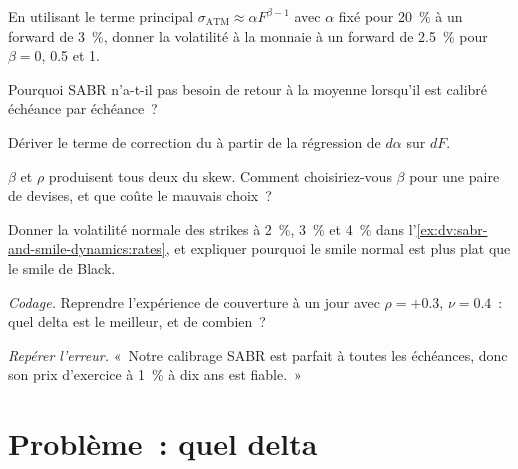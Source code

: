 \begin{exercise}[$\star$]\label{exo:dv:sabr-and-smile-dynamics:2}
En utilisant le terme principal $\sigma_{\mathrm{ATM}}\approx\alpha F^{\beta-1}$ avec $\alpha$ fixé pour 20~\% à un forward de 3~\%, donner
la volatilité à la monnaie à un forward de 2.5~\% pour $\beta=0$, 0.5 et 1.
\end{exercise}

\begin{exercise}[$\star$]\label{exo:dv:sabr-and-smile-dynamics:3}
Pourquoi SABR n'a-t-il pas besoin de retour à la moyenne lorsqu'il est calibré échéance par échéance~?
\end{exercise}

\begin{exercise}[$\star\star$]\label{exo:dv:sabr-and-smile-dynamics:4}
Dériver le terme de correction du  à partir de la régression de $d\alpha$ sur $dF$.
\end{exercise}

\begin{exercise}[$\star\star$]\label{exo:dv:sabr-and-smile-dynamics:5}
$\beta$ et $\rho$ produisent tous deux du skew. Comment choisiriez-vous $\beta$ pour une paire de devises, et que
coûte le mauvais choix~?
\end{exercise}

\begin{exercise}[$\star\star$]\label{exo:dv:sabr-and-smile-dynamics:6}
Donner la volatilité normale des strikes à 2~\%, 3~\% et 4~\% dans l'\cref{ex:dv:sabr-and-smile-dynamics:rates}, et expliquer pourquoi
le smile normal est plus plat que le smile de Black.
\end{exercise}

\begin{exercise}[$\star\star\star$]\label{exo:dv:sabr-and-smile-dynamics:7}
\emph{Codage.} Reprendre l'expérience de couverture à un jour avec $\rho=+0.3$, $\nu=0.4$~: quel delta est le meilleur, et de combien~?
\end{exercise}

\begin{exercise}[$\star\star\star$]\label{exo:dv:sabr-and-smile-dynamics:8}
\emph{Repérer l'erreur.} «~Notre calibrage SABR est parfait à toutes les échéances, donc son prix d'exercice à 1~\% à dix ans est fiable.~»
\end{exercise}

\section{Problème~: quel delta}

